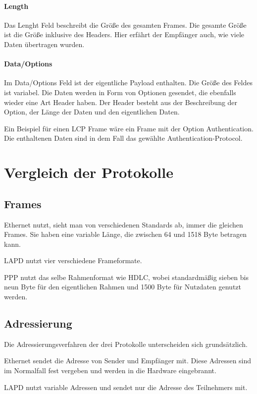 \documentclass[12pt, a4paper, ngerman]{article}
\begin{document}
\paragraph{Length}
Das Lenght Feld beschreibt die Größe des gesamten Frames. Die gesamte Größe ist die Größe inklusive des Headers. Hier erfährt der Empfänger auch, wie viele Daten übertragen wurden.
\paragraph{Data/Options}
Im Data/Options Feld ist der eigentliche Payload enthalten. Die Größe des Feldes ist variabel. Die Daten werden in Form von Optionen gesendet, die ebenfalls wieder eine Art Header haben. Der Header besteht aus der Beschreibung der Option, der Länge der Daten und den eigentlichen Daten.

Ein Beispiel für einen LCP Frame wäre ein Frame mit der Option Authentication. Die enthaltenen Daten sind in dem Fall das gewählte  Authen\-ti\-ca\-tion-Protocol.

\section{Vergleich der Protokolle}
\subsection{Frames}
Ethernet nutzt, sieht man von verschiedenen Standards ab, immer die gleichen Frames. Sie haben eine variable Länge, die zwischen 64 und 1518 Byte betragen kann.

LAPD nutzt vier verschiedene Frameformate. 

PPP nutzt das selbe Rahmenformat wie HDLC, wobei standardmäßig sieben bis neun Byte für den eigentlichen Rahmen und 1500 Byte für Nutzdaten genutzt werden.
\subsection{Adressierung}
Die Adressierungsverfahren der drei Protokolle unterscheiden sich grund\-sätz\-lich. 

Ethernet sendet die Adresse von Sender und Empfänger mit. Diese Adressen sind im Normalfall fest vergeben und werden in die Hardware eingebrannt.

LAPD nutzt variable Adressen und sendet nur die Adresse des Teilnehmers mit.
\end{document}
